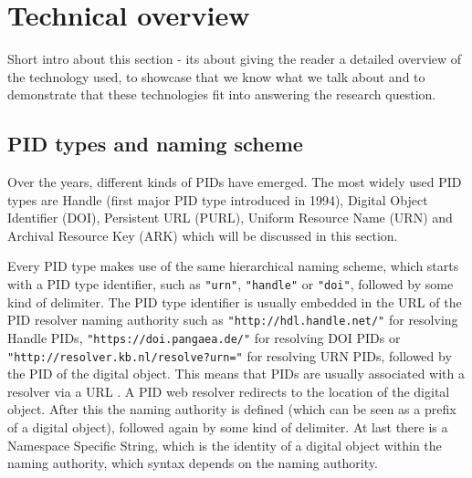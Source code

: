 \section{Technical overview}\label{tech-oview}
Short intro about this section - its about giving the reader a detailed overview of the technology used, to showcase that we know what we talk about and to demonstrate that these technologies fit into answering the research question.

\subsection{PID types and naming scheme}\label{pid-types}
Over the years, different kinds of PIDs have emerged. The most widely used PID types are Handle (first major PID type introduced 
in 1994), Digital Object Identifier (DOI), Persistent URL (PURL), Uniform Resource Name (URN) and 
Archival Resource Key (ARK) \cite{pid-oview, odin, hdl} which will be discussed in this section.

Every PID type makes use of the same hierarchical naming scheme, which starts with a PID type identifier,
 such as \texttt{"urn"}, \texttt{"handle"} or \texttt{"doi"}, followed by some kind of delimiter. The PID type identifier is usually embedded in the URL of the PID resolver naming authority 
such as \texttt{"http://hdl.handle.net/"} for resolving Handle PIDs, \texttt{"https://doi.pangaea.de/"} for resolving DOI PIDs or \texttt{"http://resolver.kb.nl/resolve?urn="} for resolving URN PIDs, followed by the PID of the digital object. This means that PIDs are usually associated with a resolver via a URL \cite{ids, icn-bd}. A PID web resolver redirects to the location of the digital object.
After this the naming authority is defined (which can be seen as a prefix of a digital object), followed again 
by some kind of delimiter. At last there is a Namespace Specific String, which is the identity of a digital object within the naming authority, which syntax depends on the naming
authority.


